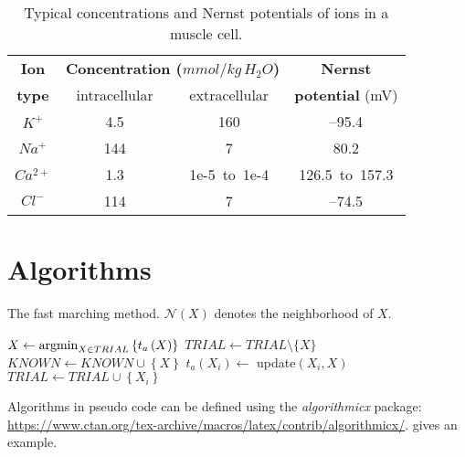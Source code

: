 \begin{table}[tb]
\caption[Ion concentrations and Nernst potential]{Typical concentrations and Nernst potentials of ions in a muscle cell.}
\centering
\begin{tabular}{>{\columncolor{lightBlue}}cccc}
  \toprule\rowcolor{lightBlue}
  \textbf{Ion}& \multicolumn{2}{c}{\textbf{Concentration ($mmol/kg\,H_2O$)}} & \textbf{Nernst}\\ \rowcolor{lightBlue}
  \textbf{type}& intracellular & extracellular & \textbf{potential} (mV)\\\rowcolor{lightBlue}
  \midrule
  $K^{+}$&\cellcolor{lightYellow} 4.5 &\cellcolor{lightYellow} 160 &\cellcolor{lightYellow} --95.4\\
  $Na^{+}$&\cellcolor{darkWhite} 144 &\cellcolor{darkWhite} 7 &\cellcolor{darkWhite} 80.2\\
  $Ca^{2+}$&\cellcolor{lightYellow} 1.3 &\cellcolor{lightYellow} 1e-5~to~1e-4 &\cellcolor{lightYellow} 126.5~to~157.3\\
  $Cl^{-}$&\cellcolor{darkWhite} 114 &\cellcolor{darkWhite} 7 &\cellcolor{darkWhite} --74.5\\
  \bottomrule
\end{tabular}
\label{tab:meth:ionConcentrations}
\end{table}


\section{Algorithms}
\label{sec:meth:algorithms}
\begin{algorithm}[tb]
\caption{The fast marching method. $\mathcal{N}\left(X\right)$ denotes the neighborhood of $X$.}
\begin{algorithmic}
  \State $X \gets \argmin_{X\in TRIAL}\left\{t_a\left(X\right)\right\}$
  \State $TRIAL \gets TRIAL\setminus\{ X\}$
  \State $KNOWN \gets KNOWN \cup \left\{ X \right\}$
    \State $t_a\left(X_i\right) \gets$ update$\left(X_i,X\right)$
      \State $TRIAL \gets TRIAL \cup \left\{X_i\right\}$
    \EndIf
  \EndFor
\EndWhile
\end{algorithmic}
\label{alg:meth:fastMarching}
\end{algorithm}Algorithms in pseudo code can be defined using the \textit{algorithmicx} package: \url{https://www.ctan.org/tex-archive/macros/latex/contrib/algorithmicx/}.  gives an example.

